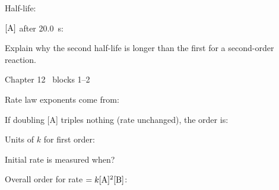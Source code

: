 \documentclass{apchem-worksheet}
\begin{document}
\begin{parts}
  \item Half-life: 
  \item $[\ce{A}]$ after \SI{20.0}{\second}: \workspace[2cm]
  \item Explain why the second half-life is longer than the first for a
        second-order reaction. 
\end{parts}

\begin{spiralstrip}{Chapter 12 \textbullet\ blocks 1--2}
  \item Rate law exponents come from:
  \item If doubling [A] triples nothing (rate unchanged), the order is:
  \item Units of $k$ for first order: 
  \item Initial rate is measured when? 
  \item Overall order for rate $= k[\ce{A}]^2[\ce{B}]$:
\end{spiralstrip}
\end{document}
